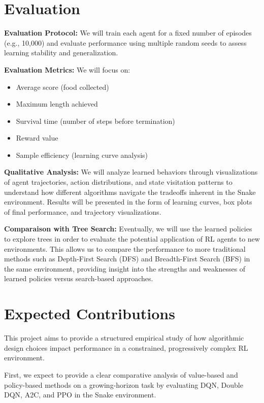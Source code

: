 \documentclass[10pt,twocolumn,letterpaper]{article}
\begin{document}
\section{Evaluation}

\textbf{Evaluation Protocol:} We will train each agent for a fixed number of episodes (e.g., 10,000) and evaluate performance using multiple random seeds to assess learning stability and generalization.

\textbf{Evaluation Metrics:} We will focus on:
\begin{itemize}
    \item Average score (food collected)
    \item Maximum length achieved
    \item Survival time (number of steps before termination)
    \item Reward value 
    \item Sample efficiency (learning curve analysis)
\end{itemize}

\textbf{Qualitative Analysis:} We will analyze learned behaviors through visualizations of agent trajectories, action distributions, and state visitation patterns to understand how different algorithms navigate the tradeoffs inherent in the Snake environment. Results will be presented in the form of learning curves, box plots of final performance, and trajectory visualizations.

\textbf{Comparaison with Tree Search:} Eventually, we will use the learned policies to explore trees in order to evaluate the potential application of RL agents to new environments. This allows us to compare the performance to more traditional methods such as Depth-First Search (DFS) and Breadth-First Search (BFS) in the same environment, providing insight into the strengths and weaknesses of learned policies versus search-based approaches.


\section{Expected Contributions}

This project aims to provide a structured empirical study of how algorithmic design choices impact performance in a constrained, progressively complex RL environment.

First, we expect to provide a clear comparative analysis of value-based and policy-based methods on a growing-horizon task by evaluating DQN, Double DQN, A2C, and PPO in the Snake environment.
\end{document}
